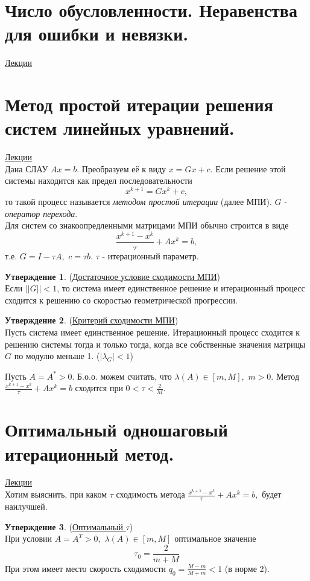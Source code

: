 \documentclass[specialist, subf, href, colorlinks=true, 12pt, times, mtpro, final]{disser}
\theoremstyle{definition}
\newtheorem{state}{Утверждение}[section]
\begin{document}
\section {Число обусловленности. Неравенства для ошибки и невязки.}
	\hyperlink {lects.56}{Лекции}\\

\section {Метод простой итерации решения систем линейных уравнений.}
	\hyperlink {lects.58}{Лекции}\\
	Дана СЛАУ $Ax = b$. Преобразуем её к виду $x = Gx + c$. Если решение этой системы находится как предел последовательности
	$$
	    x^{k+1} = Gx^{k} + c,
	$$
	то такой процесс называется {\it методом простой итерации} (далее МПИ). $G$ - {\it оператор перехода}.\\
	Для систем со знакоопредленными матрицами МПИ обычно строится в виде
	$$
	    \frac{x^{k+1} - x^{k}}{\tau} + Ax^{k} = b,
	$$
	т.е. $G = I - \tau A, \,\, c = \tau b$. $\tau$ - итерационный параметр.
	\begin{state} (\hyperlink {lects.58}{Достаточное условие сходимости МПИ})\\
	Если $||G|| < 1$, то система имеет единственное решение и итерационный процесс сходится
	к решению со скоростью геометрической прогрессии.
	\end{state}
    \begin{state} (\hyperlink {lects.59}{Критерий сходимости МПИ})\\
    Пусть система имеет единственное решение. Итерационный процесс сходится к решению системы тогда и только тогда, когда все собственные значения матрицы $G$ по модулю меньше 1. ($|\lambda_{G}| < 1$)
    \end{state}
    Пусть $A = A^* > 0$. Б.о.о. можем считать, что $\lambda(A) \in [m, M],\,\, m > 0$.
    Метод $ \frac{x^{k+1} - x^{k}}{\tau} + Ax^{k} = b$ сходится при $0 < \tau < \frac{2}{M}$.

\newpage
\section {Оптимальный одношаговый итерационный метод.}
	\hyperlink {lects.60}{Лекции}\\
	Хотим выяснить, при каком $\tau$ сходимость метода
	$\frac{x^{k+1} - x^{k}}{\tau} + Ax^{k} = b,$ будет наилучшей.
	\begin{state} (\hyperlink {lects.60}{Оптимальный $\tau$})\\
	При условии $A = A^T > 0, \,\, \lambda(A) \in [m, M]$ оптимальное значение
	$$\tau_0 = \frac{2}{m+M}$$
	При этом имеет место скорость сходимости $q_0 = \frac{M-m}{M+m} < 1$ (в норме 2).
	\end{state}
\end{document}
